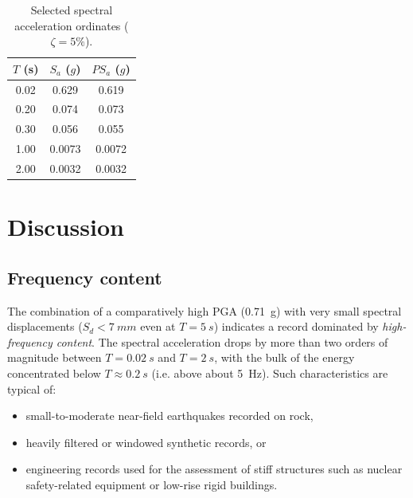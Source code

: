\documentclass[11pt,a4paper]{article}
\begin{document}
\begin{table}[h]
\centering
\caption{Selected spectral acceleration ordinates ($\zeta=5\%$).}
\label{tab:sa-vals}
\begin{tabular}{S[table-format=1.2]S[table-format=1.3]S[table-format=1.3]}
\toprule
{$T$ (s)} & {$S_a$ ($g$)} & {$PS_a$ ($g$)} \\
 & 0.629 & 0.619 \\
0.20 & 0.074 & 0.073 \\
0.30 & 0.056 & 0.055 \\
1.00 & 0.0073 & 0.0072 \\
2.00 & 0.0032 & 0.0032 \\
\bottomrule
\end{tabular}
\end{table}

\section{Discussion}
\label{sec:disc}

\subsection{Frequency content}
The combination of a comparatively high PGA (\SI{0.71}{g}) with very
small spectral displacements ($S_d < \SI{7}{mm}$ even at $T=\SI{5}{s}$)
indicates a record dominated by \emph{high-frequency content}. The
spectral acceleration drops by more than two orders of magnitude between
$T=\SI{0.02}{s}$ and $T=\SI{2}{s}$, with the bulk of the energy
concentrated below $T \approx \SI{0.2}{s}$ (i.e. above about \SI{5}{Hz}).
Such characteristics are typical of:
\begin{itemize}[leftmargin=1.4em,itemsep=0.15em]
  \item small-to-moderate near-field earthquakes recorded on rock,
  \item heavily filtered or windowed synthetic records, or
  \item engineering records used for the assessment of stiff structures
        such as nuclear safety-related equipment or low-rise rigid
        buildings.
\end{itemize}
\end{document}
